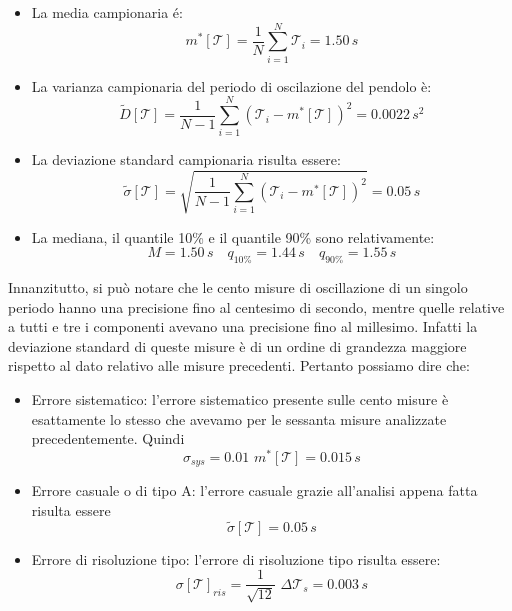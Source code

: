 \begin{itemize}
    \item{La media campionaria é:}
        \begin{equation}
            m^*[\mathcal{T}] = \frac{1}{N} \sum_{i=1}^{N} \mathcal{T}_i = 1.50\,s
        \end{equation} 

    \item{La varianza campionaria del periodo di oscilazione del pendolo è:}
        \begin{equation}
            \tilde{D}[\mathcal{T}] = \frac{1}{N - 1} \sum_{i=1}^{N} (\mathcal{T}_i - m^*[\mathcal{T}])^2 = 0.0022\,s^2
        \end{equation}

    \item{La deviazione standard campionaria risulta essere:}
        \begin{equation}
            \tilde{\sigma}[\mathcal{T}] = \sqrt{\frac{1}{N - 1} \sum_{i=1}^{N} (\mathcal{T}_i - m^*[\mathcal{T}])^2} = 0.05\,s
        \end{equation}

    \item{La mediana, il quantile 10\% e il quantile 90\% sono relativamente:}
        \begin{equation*}
            M = 1.50\,s \quad
            q_{10\%} = 1.44\,s \quad
            q_{90\%} = 1.55\,s
        \end{equation*}
\end{itemize}

Innanzitutto, si può notare che le cento misure di oscillazione di un singolo periodo hanno una precisione fino al centesimo di secondo, mentre quelle relative a tutti e tre i componenti avevano una precisione fino al millesimo. Infatti la deviazione standard di queste misure è di un ordine di grandezza maggiore rispetto al dato relativo alle misure precedenti.
Pertanto possiamo dire che:

\begin{itemize}
	\item{Errore sistematico: l'errore sistematico presente sulle cento misure è esattamente lo stesso che avevamo per le sessanta misure analizzate precedentemente. Quindi 
		\begin{equation}
			\sigma_{sys} = 0.01\,\,m^*[\mathcal{T}] = 0.015\,s
		\end{equation}	 }
	\item{Errore casuale o di tipo A: l'errore casuale grazie all'analisi appena fatta risulta essere
		\begin{equation}
			\tilde{\sigma}[\mathcal{T}] = 0.05\,s
		\end{equation}}
	\item{Errore di risoluzione tipo: l'errore di risoluzione tipo risulta essere:
		\begin{equation}
			 {\sigma}[\mathcal{T}]_{ris} = \frac{1}{\sqrt{12}} \,\, \Delta\mathcal{T}_{s} = 0.003\,s	
		\end{equation}}
\end{itemize}

